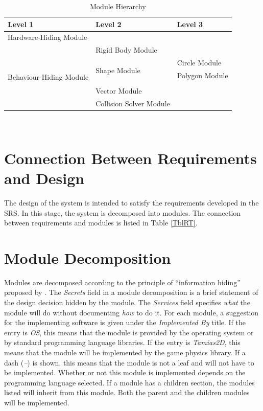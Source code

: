 \documentclass[12pt]{article}
\newcommand{\progname}{Tamias2D}
\begin{document}
\begin{table}[h!]
\centering
\begin{tabular}{p{} p{} p{}}
\toprule
\textbf{Level 1} & \textbf{Level 2}  & \textbf{Level 3} \\
\midrule

{Hardware-Hiding Module} & ~ \\
\midrule

\multirow{7}{0.3\textwidth}{Behaviour-Hiding Module} 
& Rigid Body Module \\
& \multirow{3}{0.3\textwidth}{Shape Module} 
& Circle Module \\
& &Polygon Module \\ 
& Space Module \\ 
\midrule
\multirow{3}{0.3\textwidth}{Software Decision Module} 
& Vector Module \\
& Collision Solver Module \\  
\bottomrule
\end{tabular}
\caption{Module Hierarchy}
\label{TblMH}
\end{table}

~\newpage

\section{Connection Between Requirements and Design} \label{SecConnection}
The design of the system is intended to satisfy the requirements developed in
the SRS. In this stage, the system is decomposed into modules. The connection
between requirements and modules is listed in Table \ref{TblRT}.

\section{Module Decomposition} \label{SecMD}

Modules are decomposed according to the principle of ``information hiding''
proposed by \citet{ParnasEtAl1984}. The \emph{Secrets} field in a module
decomposition is a brief statement of the design decision hidden by the
module. The \emph{Services} field specifies \emph{what} the module will do
without documenting \emph{how} to do it. For each module, a suggestion for the implementing software is given under the \emph{Implemented By} title. If the entry is \emph{OS}, this means that the module is provided by the operating system or by standard programming language libraries. If the entry is \emph{\progname}, this means that the module will be implemented by the game physics library.  
If a dash (\emph{--}) is shown, this means
that the module is not a leaf and will not have to be implemented. Whether or
not this module is implemented depends on the programming language
selected.
If a module has a children section, the modules listed will inherit from  
this module. Both the parent and the children modules will be implemented.
\end{document}
